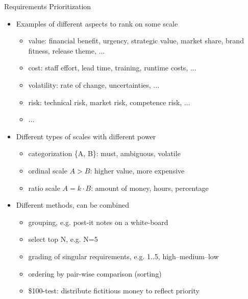 \documentclass{simpleslides}
\begin{document}
\begin{frame}[fragile]{Requirements Prioritization}

\begin{itemize}
\item Examples of different aspects to rank on some scale
\begin{itemize}
  \item value: financial benefit, urgency, strategic value, market share, brand fitness, release theme, ...
  \item cost: staff effort, lead time, training, runtime costs, ... 
  \item volatility: rate of change, uncertainties, ...
  \item risk: technical risk, market risk, competence risk, ...
  \item ...
\end{itemize}
\item Different types of scales with different power
\begin{itemize}
  \item categorization \{A, B\}: must, ambiguous, volatile
  \item ordinal scale $A > B$: higher value, more expensive 
  \item ratio scale $A = k \cdot B$: amount of money, hours, percentage
\end{itemize}
\item Different methods, can be combined
\begin{itemize}
  \item grouping, e.g. post-it notes on a white-board
  \item select top N, e.g. N=5
  \item grading of singular requirements, e.g. 1..5, high--medium--low 
  \item ordering by pair-wise comparison (sorting)
  \item \$100-test: distribute fictitious money to reflect priority
\end{itemize}
\end{itemize}
\end{frame}
\end{document}

